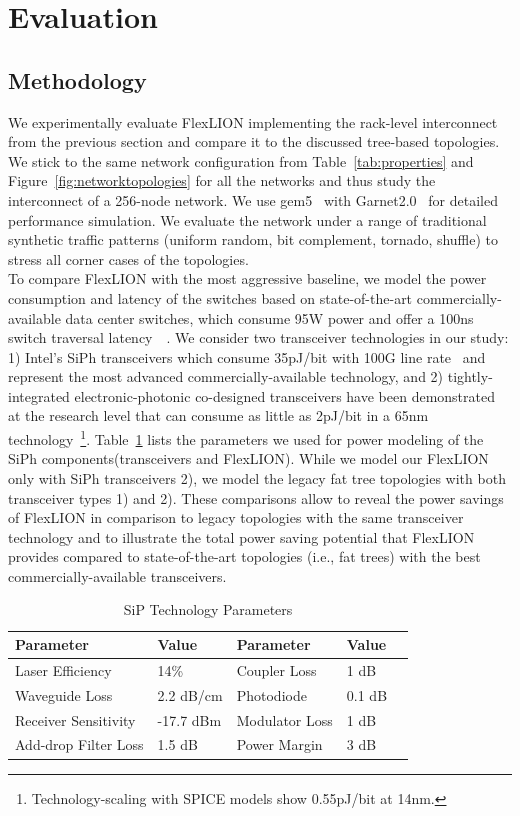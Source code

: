 \section{Evaluation}
\subsection{Methodology}
We experimentally evaluate FlexLION implementing the rack-level interconnect from the previous section and compare it to the discussed tree-based topologies. We stick to the same network configuration from Table~\ref{tab:properties} and Figure~\ref{fig:networktopologies} for all the networks and thus study the interconnect of a 256-node network. We use gem5~\cite{binkert2011gem5} with Garnet2.0~\cite{agarwal2009garnet} for detailed performance simulation. We evaluate the network under a range of traditional synthetic traffic patterns (uniform random, bit complement, tornado, shuffle) to stress all corner cases of the topologies. \\
To compare FlexLION with the most aggressive baseline, we model the power consumption and latency of the switches based on state-of-the-art commercially-available data center switches, which consume 95W power and offer a 100ns switch traversal latency~\cite{intelomnipath}~\cite{mellanox}. We consider two transceiver technologies in our study: 1) Intel's SiPh transceivers which consume 35pJ/bit with 100G line rate~\cite{intelsip} and represent the most advanced commercially-available technology, and 2) tightly-integrated electronic-photonic co-designed transceivers have been demonstrated at the research level that can consume as little as 2pJ/bit in a 65nm technology~\cite{li201525}\footnote{Technology-scaling with SPICE models show 0.55pJ/bit at 14nm.}. Table~\ref{fig:sipparameter} lists the parameters we used for power modeling of the SiPh components(transceivers and FlexLION). While we model our FlexLION only with SiPh transceivers 2), we model the legacy fat tree topologies with both transceiver types 1) and 2). These comparisons allow to reveal the power savings of FlexLION in comparison to legacy topologies with the same transceiver technology and to illustrate the total power saving potential that FlexLION provides compared to state-of-the-art topologies (i.e., fat trees) with the best commercially-available transceivers. 
\begin{table}[]
\centering
\caption{SiP Technology Parameters}
\label{fig:sipparameter}
\begin{tabular}{@{}lllll@{}}
\toprule
Parameter            & Value     & Parameter      & Value  &  \\ \midrule
Laser Efficiency     & 14\%      & Coupler Loss   & 1 dB   &  \\
Waveguide Loss       & 2.2 dB/cm & Photodiode     & 0.1 dB &  \\
Receiver Sensitivity & -17.7 dBm & Modulator Loss & 1 dB   &  \\
Add-drop Filter Loss & 1.5 dB    & Power Margin   & 3 dB   &  \\ \bottomrule
\end{tabular}
\end{table}
